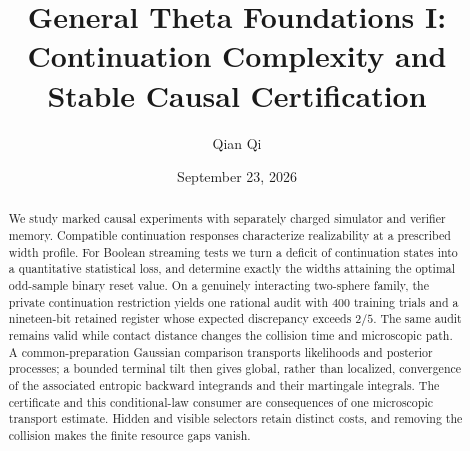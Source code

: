 
\usepackage{tikz}
\usetikzlibrary{arrows.meta,positioning}
\newcommand{\Wone}{W_1}
\newcommand{\Del}{\Delta}
\newcommand{\emptyw}{\varnothing}
\newcommand{\osc}{\operatorname{osc}}
\newcommand{\diam}{\operatorname{diam}}
\newcommand{\Lipone}{\operatorname{Lip}_1}
\newcommand{\aff}{\operatorname{aff}}
\newcommand{\conv}{\operatorname{conv}}
\newcommand{\rplus}{\operatorname{rank}_{+}}
\newcommand{\dpr}{\delta^{\rm p}}
\newcommand{\dhi}{\delta^{\rm h}}
\newcommand{\dvi}{\delta^{\rm v}}
\newcommand{\dmix}{\delta^{\rm mix}}
\newcommand{\cK}{\mathcal K}
\newcommand{\cB}{\mathcal B}
\newcommand{\cI}{\mathcal I}
\newcommand{\KL}{\operatorname{KL}}
\newcommand{\vaudit}{v^{\rm aud}}
\title[General Theta Foundations I]{General Theta Foundations I:\\Continuation Complexity and Stable Causal Certification}
\author{Qian Qi}
\date{September 23, 2026}

\begin{abstract}
We study marked causal experiments with separately charged simulator and
verifier memory. Compatible continuation responses characterize realizability
at a prescribed width profile. For Boolean streaming tests we turn a deficit
of continuation states into a quantitative statistical loss, and determine
exactly the widths attaining the optimal odd-sample binary reset value.
On a genuinely interacting two-sphere family, the private continuation
restriction yields one rational audit with $400$ training trials and a
nineteen-bit retained register whose expected discrepancy exceeds $2/5$.
The same audit remains valid while contact distance changes the collision
time and microscopic path. A common-preparation Gaussian comparison
transports likelihoods and posterior processes; a bounded terminal tilt
then gives global, rather than localized, convergence of the associated
entropic backward integrands and their martingale integrals. The certificate
and this conditional-law consumer are consequences of one microscopic
transport estimate. Hidden and visible selectors retain distinct costs,
and removing the collision makes the finite resource gaps vanish.
\end{abstract}
\maketitle
\tableofcontents
